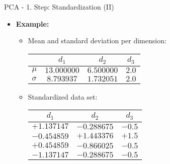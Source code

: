 \begin{frame}{PCA - 1. Step: Standardization (II)}
	\begin{itemize}
		\item \textbf{Example:}
		      \begin{itemize}
			      \item Mean and standard deviation per dimension: \\
			            \vspace{3mm}
			            \begin{center}
				            \centering
				            \begin{tabular}{|l|c|c|c|}
					            \hline
					                     & $d_1$       & $d_2$      & $d_3$ \\
					            \hline
					            $\mu$    & $13.000000$ & $6.500000$ & $2.0$ \\
					            \hline
					            $\sigma$ & $8.793937$  & $1.732051$ & $2.0$ \\
					            \hline
				            \end{tabular}
			            \end{center}
			            \vspace{3mm}
			      \item Standardized data set: \\
			            \vspace{3mm}
			            \begin{center}
				            \centering
				            \begin{tabular}{|c|c|c|}
					            \hline
					            $d_1$       & $d_2$       & $d_3$
					            \\\hline
					            $+1.137147$ & $-0.288675$ & $-0.5$
					            \\\hline
					            $-0.454859$ & $+1.443376$ & $+1.5$
					            \\\hline
					            $+0.454859$ & $-0.866025$ & $-0.5$
					            \\\hline
					            $-1.137147$ & $-0.288675$ & $-0.5$
					            \\\hline
				            \end{tabular}
			            \end{center}
		      \end{itemize}
	\end{itemize}
\end{frame}


